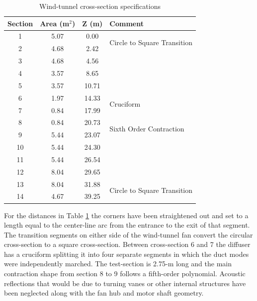 \begin{table}
  \centering
  \caption{Wind-tunnel cross-section specifications}
  \begin{tabular}{c c c l}
    Section & Area (m$^2$) & Z (m) & Comment \\
    \hline \hline
    1 & 5.07 & 0.00 & \multirow{2}{2in}{Circle to Square Transition}\\
    2 & 4.68 & 2.42 & \\
    3 & 4.68 & 4.56 & \\
    4 & 3.57 & 8.65 & \\
    5 & 3.57 & 10.71 & \\
    6 & 1.97 & 14.33 & \multirow{2}{2in}{Cruciform}\\
    7 & 0.84 & 17.99 & \multirow{2}{2in}{Test-Section}\\
    8 & 0.84 & 20.73 & \multirow{2}{2in}{Sixth Order Contraction}\\
    9 & 5.44 & 23.07 & \\
    10 & 5.44 & 24.30 & \\
    11 & 5.44 & 26.54 & \\
    12 & 8.04 & 29.65 & \\
    13 & 8.04 & 31.88 & \multirow{2}{2in}{Circle to Square Transition}\\
    14 & 4.67 & 39.25 & \\
  \end{tabular}
  \label{tab:03_wind_tunnel_specs}
\end{table}
For the distances in Table \ref{tab:03_wind_tunnel_specs} the corners have been straightened out and set to a length equal to the center-line arc from the entrance to the exit of that segment.
The transition segments on either side of the wind-tunnel fan convert the circular cross-section to a square cross-section.
Between cross-section 6 and 7 the diffuser has a cruciform splitting it into four separate segments in which the duct modes were independently marched.
The test-section is 2.75-m long and the main contraction shape from section 8 to 9 follows a fifth-order polynomial.
Acoustic reflections that would be due to turning vanes or other internal structures have been neglected along with the fan hub and motor shaft geometry.

